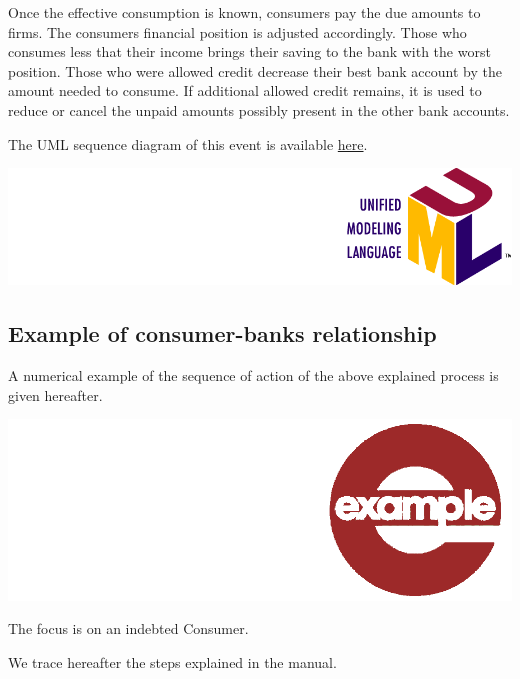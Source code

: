 \documentclass{book}
\newcommand{\doclocation}{file:///Users/giulioni/Documents/workspace/gabriele/docs}
\begin{document}
Once the effective consumption is known, consumers pay the due amounts to firms.
The consumers financial position is adjusted accordingly.
Those who consumes less that their income brings their saving to the bank with the worst position. Those who were allowed credit decrease their best bank account by the amount needed to consume. If additional allowed credit remains, it is used to reduce or cancel the unpaid amounts possibly present in the other bank accounts.   

The UML sequence diagram of this event is available \href{\doclocation/umldoc/updateBankAccountAccordingToEffectiveConsumption.html}{here}.
\begin{marginfigure}
	\includegraphics[scale=0.1]{uml.png}
\end{marginfigure}

\subsection{Example of consumer-banks relationship}

A numerical example of the sequence of action of the above explained process is given hereafter.%
\begin{marginfigure}
\hskip8mm	\includegraphics[scale=0.07]{example.png}
\end{marginfigure}

The focus is on an indebted Consumer.

We trace hereafter the steps explained in the manual.  
\end{document}
